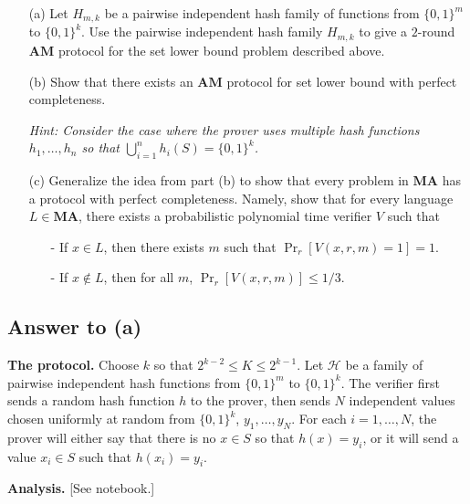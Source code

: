 \documentclass{article}
\newcommand{\AM}{\mathbf{AM}}
\newcommand{\MA}{\mathbf{MA}}
\begin{document}
\begin{enumerate}
    \item[(a)] Let $H_{m,k}$ be a pairwise independent hash family of functions from $\{0,1\}^m$ to $\{0,1\}^k$. Use the pairwise independent hash family $H_{m,k}$ to give a $2$-round $\AM$ protocol for the set lower bound problem described above.
    
    \item[(b)] Show that there exists an $\AM$ protocol for set lower bound with perfect completeness.

    \emph{Hint: Consider the case where the prover uses multiple hash functions $h_1,\dots, h_n$ so that $\bigcup_{i = 1}^n h_i(S) = \{0,1\}^k$.}
    
    \item[(c)] Generalize the idea from part (b) to show that every problem in $\MA$ has a protocol with perfect completeness. Namely, show that for every language $L\in \MA$, there exists a probabilistic polynomial time verifier $V$ such that 
    \begin{enumerate}
        \item[-] If $x\in L$, then there exists $m$ such that $\Pr_r[V(x,r,m) = 1] = 1$.
        \item[-] If $x\not\in L$, then for all $m$, $\Pr_r[V(x,r,m)]\le 1/3$.
    \end{enumerate}
\end{enumerate}

\newpage
\subsection*{Answer to (a)}
\textbf{The protocol.}
Choose $k$ so that $2^{k-2} \leq K \leq 2^{k-1}$.
Let $\mathcal{H}$ be a family of pairwise independent hash functions from $\{0, 1\}^m$ to $\{0, 1\}^k$.
The verifier first sends a random hash function $h$ to the prover,
then sends $N$ independent values chosen uniformly at random from $\{0, 1\}^k$, $y_1, \dots, y_N$.
For each $i = 1, \dots, N$, the prover will either say that there is no $x \in S$ so that $h(x) = y_i$, or it will send a value $x_i \in S$ such that $h(x_i) = y_i$.

\medskip
\noindent
\textbf{Analysis.}
[See notebook.]

\end{document}
